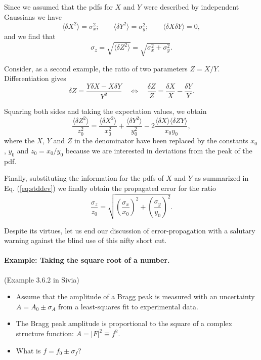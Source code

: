 \documentclass[%
oneside,                 %
final,                   %
10pt]{article}
\begin{document}
Since we assumed that the pdfs for $X$ and $Y$ were described by independent Gaussians we have
\begin{equation}
\langle \delta X^2 \rangle = \sigma_x^2; \qquad \langle \delta Y^2 \rangle = \sigma_y^2; \qquad \langle \delta X \delta Y \rangle = 0,
\label{eq:stddev}
\end{equation}
and we find that
\[
\sigma_z = \sqrt{ \langle \delta Z^2 \rangle } = \sqrt{ \sigma_x^2 + \sigma_y^2 }.
\]

Consider, as a second example, the ratio of two parameters $Z = X/Y$. Differentiation gives
\[
\delta Z = \frac{Y \delta X - X \delta Y}{Y^2} \quad \Leftrightarrow \quad \frac{\delta Z}{Z} = \frac{\delta X}{X} - \frac{\delta Y}{Y}.
\]

Squaring both sides and taking the expectation values, we obtain
\[
\frac{\langle \delta Z^2 \rangle}{z_0^2} = \frac{\langle \delta X^2 \rangle}{x_0^2} + \frac{\langle \delta Y^2 \rangle}{y_0^2} - 2 \frac{\langle \delta X \rangle \langle \delta ZY \rangle}{x_0 y_0},
\]
where the $X$, $Y$ and $Z$ in the denominator have been replaced by the constants $x_0$, $y_0$ and $z_0 = x_0 / y_0$ because we are interested in deviations from the peak of the pdf.

Finally, substituting the information for the pdfs of $X$ and $Y$ as summarized in Eq. (\ref{eq:stddev}) we finally obtain the propagated error for the ratio
\[
\frac{\sigma_z}{z_0} = \sqrt{ \left( \frac{\sigma_x}{x_0} \right)^2 + \left( \frac{\sigma_y}{y_0} \right)^2}.
\]

Despite its virtues, let us end our discussion of error-propagation with a salutary warning against the blind use of this nifty short cut.


\paragraph{Example: Taking the square root of a number.}
(Example 3.6.2 in Sivia)

\begin{itemize}
\item Assume that the amplitude of a Bragg peak is measured with an uncertainty $A = A_0 \pm \sigma_A$ from a least-squares fit to experimental data.

\item The Bragg peak amplitude is proportional to the square of a complex structure function: $A = |F|^2 \equiv f^2$.

\item What is $f = f_0 \pm \sigma_f$?
\end{itemize}
\end{document}
